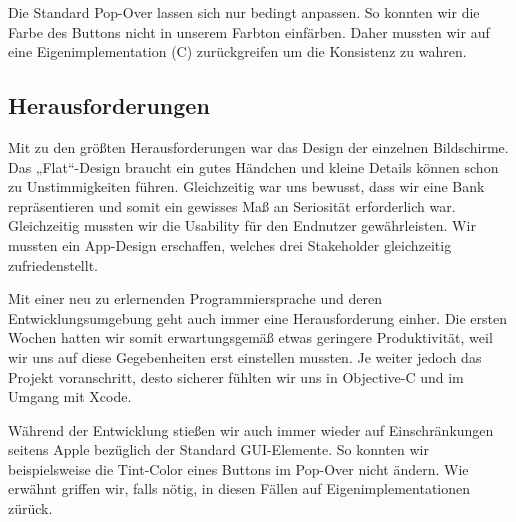 Die Standard Pop-Over lassen sich nur bedingt anpassen. So konnten wir die Farbe des Buttons nicht in unserem Farbton einfärben. Daher mussten wir auf eine Eigenimplementation (C) zurückgreifen um die Konsistenz zu wahren.


\subsection{Herausforderungen}
	Mit zu den größten Herausforderungen war das Design der einzelnen Bildschirme. Das „Flat“-Design braucht ein gutes Händchen und kleine Details können schon zu Unstimmigkeiten führen. Gleichzeitig war uns bewusst, dass wir eine Bank repräsentieren und somit ein gewisses Maß an Seriosität erforderlich war. Gleichzeitig mussten wir die Usability für den Endnutzer gewährleisten. Wir mussten ein App-Design erschaffen, welches drei Stakeholder gleichzeitig zufriedenstellt.

%

	Mit einer neu zu erlernenden Programmiersprache und deren Entwicklungsumgebung geht auch immer eine Herausforderung einher. Die ersten Wochen hatten wir somit erwartungsgemäß etwas geringere Produktivität, weil wir uns auf diese Gegebenheiten erst einstellen mussten. Je weiter jedoch das Projekt voranschritt, desto sicherer fühlten wir uns in Objective-C und im Umgang mit Xcode.

	Während der Entwicklung stießen wir auch immer wieder auf Einschränkungen seitens Apple bezüglich der Standard GUI-Elemente. So konnten wir beispielsweise die Tint-Color eines Buttons im Pop-Over nicht ändern. Wie erwähnt griffen wir, falls nötig, in diesen Fällen auf Eigenimplementationen zürück.
	

